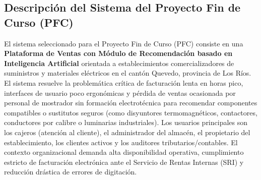 \documentclass[conference,10pt]{IEEEtran}
\begin{document}
	\subsection{Descripción del Sistema del Proyecto Fin de Curso (PFC)}
	El sistema seleccionado para el Proyecto Fin de Curso (PFC) consiste en una \textbf{Plataforma de Ventas con Módulo de Recomendación basado en Inteligencia Artificial} orientada a establecimientos comercializadores de suministros y materiales eléctricos en el cantón Quevedo, provincia de Los Ríos. El sistema resuelve la problemática crítica de facturación lenta en horas pico, interfaces de usuario poco ergonómicas y pérdida de ventas ocasionada por personal de mostrador sin formación electrotécnica para recomendar componentes compatibles o sustitutos seguros (como disyuntores termomagnéticos, contactores, conductores por calibre o luminarias industriales). Los usuarios principales son los cajeros (atención al cliente), el administrador del almacén, el propietario del establecimiento, los clientes activos y los auditores tributarios/contables. El contexto organizacional demanda alta disponibilidad operativa, cumplimiento estricto de facturación electrónica ante el Servicio de Rentas Internas (SRI) y reducción drástica de errores de digitación.
\end{document}
